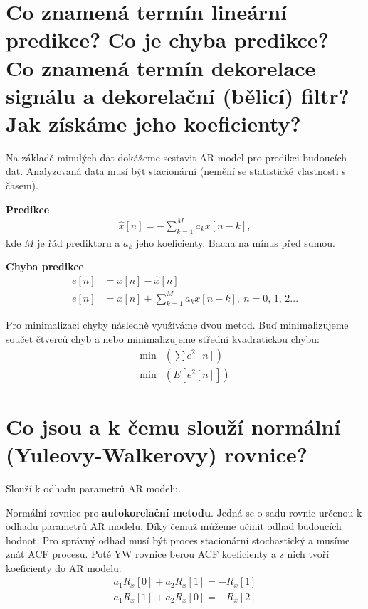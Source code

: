 \documentclass[a4paper,12pt]{article}   %
\newcommand{\mt}[1]{$#1$}
\begin{document}
\FloatBarrier

\section{Co znamená termín lineární predikce? Co je chyba predikce? Co znamená termín dekorelace signálu a dekorelační (bělicí) filtr? Jak získáme jeho koeficienty?}\label{sec:lin:predikce}

Na základě minulých dat dokážeme sestavit AR model pro predikci budoucích dat. Analyzovaná data musí být stacionární (nemění se statistické vlastnosti s časem).

\textbf{Predikce}
\begin{align*}
        \hat{x}[n] = -\sum ^M _{k=1} a_k x[n-k],
\end{align*}
kde \mt{M} je řád prediktoru a \mt{a_k} jeho koeficienty. Bacha na mínus před sumou.

\textbf{Chyba predikce}
\begin{align*}
        e[n] &= x[n] - \hat{x}[n]\\
        e[n] &= x[n] + \sum_{k=1}^M a_k x[n-k],~n=0,\,1,\,2...
\end{align*}

Pro minimalizaci chyby následně využíváme dvou metod. Buď minimalizujeme součet čtverců chyb a nebo minimalizujeme střední kvadratickou chybu:
\begin{align*}
        \text{min}&(\sum e^2[n] )\\
        \text{min}&(E[e^2[n]])
\end{align*}


\section{Co jsou a k čemu slouží normální (Yuleovy-Walkerovy) rovnice?}\label{sec:yule}

Slouží k odhadu parametrů AR modelu. 

Normální rovnice pro \textbf{autokorelační metodu}. Jedná se o sadu rovnic určenou k odhadu parametrů AR modelu. Díky čemuž můžeme učinit odhad budoucích hodnot. Pro správný odhad musí být proces stacionární stochastický a musíme znát ACF procesu. 
Poté YW rovnice berou ACF koeficienty a z nich tvoří koeficienty do AR modelu.
\begin{align*}
        a_1 R_x[0] + a_2 R_x[1] = -R_x[1]\\
        a_1 R_x[1] + a_2 R_x[0] = -R_x[2]
\end{align*}
\end{document}
